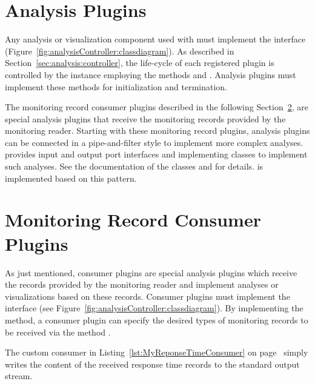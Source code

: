 
\setJavaCodeListing


\section{Analysis Plugins}\label{sec:analysis:plugins}

Any analysis or visualization component used with \KiekerAnalysisPart{} must %
implement the interface  (Figure~\ref{fig:analysisController:classdiagram}). %
As described in Section~\ref{sec:analysis:controller}, the life-cycle of each %
registered plugin is controlled by the  instance %
employing the methods  and . Analysis plugins %
must implement these methods for initialization and termination.

The monitoring record consumer plugins described in the following %
Section~\ref{sec:analysis:consumer}, are special analysis plugins that receive %
the monitoring records provided by the monitoring reader. %
Starting with these monitoring record plugins, analysis plugins can be connected %
in a pipe-and-filter style to implement more complex analyses. %
\Kieker{} provides input and output port interfaces and implementing classes %
to implement such analyses. See the documentation of the classes  %
and  for details. \KiekerTraceAnalysis{} is implemented %
based on this pattern. 

\section{Monitoring Record Consumer Plugins}\label{sec:analysis:consumer}

As just mentioned, consumer plugins are special analysis plugins which receive %
the records provided by the monitoring reader and implement analyses or %
visualizations based on these records. %
Consumer plugins must implement the interface  %
(see Figure~\ref{fig:analysisController:classdiagram}). %
By implementing the  method, a consumer plugin %
can specify the desired types of monitoring records to be received via the %
method .

The custom consumer in Listing~\ref{lst:MyReponseTimeConsumer} on %
page~\pageref{lst:MyReponseTimeConsumer} simply writes %
the content of the received response time records to the standard output stream.

\pagebreak

\setJavaCodeListing

